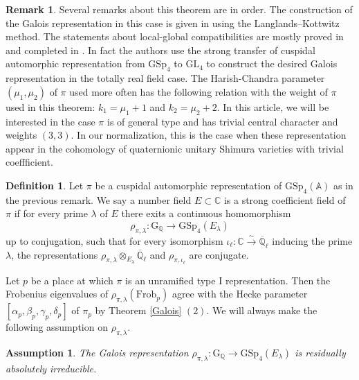 \documentclass[10pt]{amsart}
\numberwithin{equation}{section}
\newtheorem{assumption}[equation]{Assumption}
\theoremstyle{definition}
\newtheorem{remark}[equation]{Remark}
\newtheorem{definition}[equation]{Definition}
\def\GL{\mathrm{GL}}
\def\GSp{\mathrm{GSp}}
\def\CC{\mathbb{C}}
\def\QQ{\mathbb{Q}}
\def\rmG{\mathrm{G}}
\def\rmI{\mathrm{I}}
\begin{document}
\begin{remark}
Several remarks about this theorem are in order. The construction of the Galois representation in this case is given in \cite{La-Siegel, La-SiegelII, Wei-Galois, Tay-Siegel} using the Langlands--Kottwitz method. The statements about local-global compatibilities are mostly proved in \cite{Sor-local-global} and completed in \cite{Mok-GSp}. In fact the authors use the strong transfer of cuspidal automorphic representation from $\GSp_{4}$ to $\GL_{4}$ to construct the desired Galois representation in the totally real field case. The Harish-Chandra parameter $(\mu_{1}, \mu_{2})$ of $\pi$ used more often has the following relation with the weight of $\pi$ used in this theorem: $k_{1}=\mu_{1}+1$ and $k_{2}=\mu_{2}+2$. In this article, we will be interested in the case $\pi$ is of general type and has trivial central character and weights $(3, 3)$.  In our normalization, this is the case when these representation appear in the cohomology of quaternionic unitary Shimura varieties with trivial coeffficient.
\end{remark}


\begin{definition}\label{strong-field}
Let $\pi$ be a cuspidal automorphic representation of $\GSp_{4}(\mathbb{A})$ as in the previous remark. We say a number field $E\subset \CC$ is a strong coefficient field of $\pi$ if for every prime $\lambda$ of $E$ there exits a continuous homomorphism 
\begin{equation*}
\rho_{\pi,\lambda}: \rmG_{\QQ}\rightarrow \GSp_{4}(E_{\lambda})
\end{equation*}
up to conjugation, such that for every isomorphism $\iota_{\ell}:\CC\xrightarrow{\sim}\overline{\QQ}_{\ell}$ inducing the prime $\lambda$, the representations $\rho_{\pi,\lambda}\otimes_{E_{\lambda}}\overline{\QQ}_{\ell}$ and $\rho_{\pi,\iota_{\ell}}$ are conjugate.
\end{definition}

Let $p$ be a place at  which $\pi$ is an unramified type $\rmI$ representation. Then the Frobenius eigenvalues of $\rho_{\pi, \lambda}(\mathrm{Frob}_{p})$ agree with the Hecke parameter $[\alpha_{p}, \beta_{p}, \gamma_{p}, \delta_{p}]$ of $\pi_{p}$ by Theorem \ref{Galois} $(2)$. We will always make the following assumption on $\rho_{\pi, \lambda}$.
\begin{assumption}\label{irrd}
The Galois representation $\rho_{\pi, \lambda}: \rmG_{\QQ}\rightarrow \GSp_{4}(E_{\lambda})$ is residually absolutely irreducible. 
\end{assumption}
\end{document}
